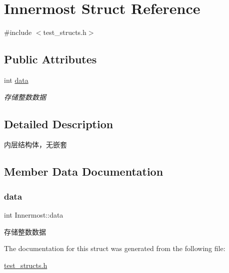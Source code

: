 \hypertarget{structInnermost}{}\section{Innermost Struct Reference}
\label{structInnermost}


{\ttfamily \#include $<$test\+\_\+structs.\+h$>$}

\subsection*{Public Attributes}
\begin{DoxyCompactItemize}
\item 
int \hyperlink{structInnermost_a4292b84dd3e4f2f09763688c7755084e}{data}
\begin{DoxyCompactList}\small\item\em 存储整数数据 \end{DoxyCompactList}\end{DoxyCompactItemize}


\subsection{Detailed Description}
内层结构体，无嵌套 

\subsection{Member Data Documentation}
\mbox{\label{structInnermost_a4292b84dd3e4f2f09763688c7755084e}} 
\subsubsection{\texorpdfstring{data}{data}}
{\footnotesize\ttfamily int Innermost\+::data}



存储整数数据 



The documentation for this struct was generated from the following file\+:\begin{DoxyCompactItemize}
\item 
\hyperlink{test__structs_8h}{test\+\_\+structs.\+h}\end{DoxyCompactItemize}
